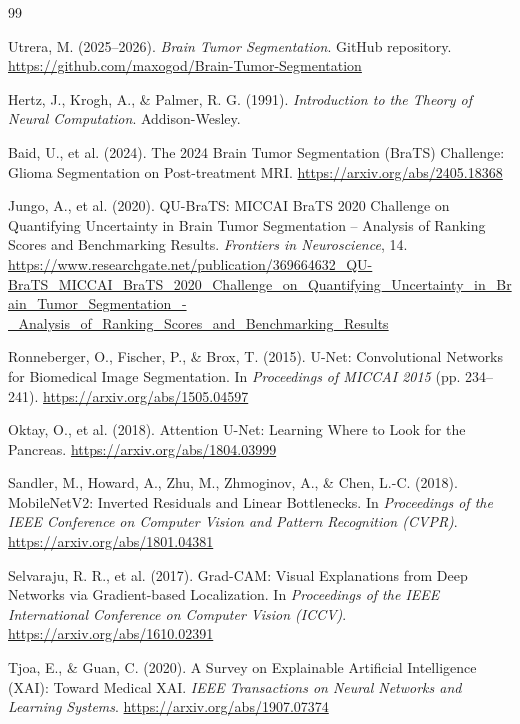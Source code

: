 \begin{thebibliography}{99}

Utrera, M. (2025--2026).
\textit{Brain Tumor Segmentation}.
GitHub repository.
\url{https://github.com/maxogod/Brain-Tumor-Segmentation}

Hertz, J., Krogh, A., \& Palmer, R. G. (1991).
\textit{Introduction to the Theory of Neural Computation}.
Addison-Wesley.


Baid, U., et al. (2024).
The 2024 Brain Tumor Segmentation (BraTS) Challenge: Glioma Segmentation on Post-treatment MRI.
\url{https://arxiv.org/abs/2405.18368}

Jungo, A., et al. (2020).
QU-BraTS: MICCAI BraTS 2020 Challenge on Quantifying Uncertainty in Brain Tumor Segmentation -- Analysis of Ranking Scores and Benchmarking Results.
\textit{Frontiers in Neuroscience}, 14.
\url{https://www.researchgate.net/publication/369664632_QU-BraTS_MICCAI_BraTS_2020_Challenge_on_Quantifying_Uncertainty_in_Brain_Tumor_Segmentation_-_Analysis_of_Ranking_Scores_and_Benchmarking_Results}


Ronneberger, O., Fischer, P., \& Brox, T. (2015).
U-Net: Convolutional Networks for Biomedical Image Segmentation.
In \textit{Proceedings of MICCAI 2015} (pp. 234--241).
\url{https://arxiv.org/abs/1505.04597}

Oktay, O., et al. (2018).
Attention U-Net: Learning Where to Look for the Pancreas.
\url{https://arxiv.org/abs/1804.03999}

Sandler, M., Howard, A., Zhu, M., Zhmoginov, A., \& Chen, L.-C. (2018).
MobileNetV2: Inverted Residuals and Linear Bottlenecks.
In \textit{Proceedings of the IEEE Conference on Computer Vision and Pattern Recognition (CVPR)}.
\url{https://arxiv.org/abs/1801.04381}

Selvaraju, R. R., et al. (2017).
Grad-CAM: Visual Explanations from Deep Networks via Gradient-based Localization.
In \textit{Proceedings of the IEEE International Conference on Computer Vision (ICCV)}.
\url{https://arxiv.org/abs/1610.02391}

Tjoa, E., \& Guan, C. (2020).
A Survey on Explainable Artificial Intelligence (XAI): Toward Medical XAI.
\textit{IEEE Transactions on Neural Networks and Learning Systems}.
\url{https://arxiv.org/abs/1907.07374}


\end{thebibliography}
